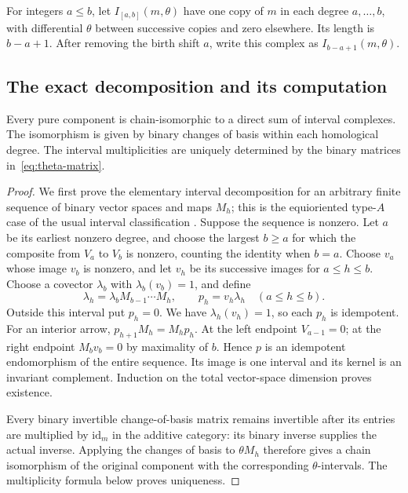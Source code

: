 \begin{definition}
For integers $a\le b$, let $I_{[a,b]}(m,\theta)$ have one copy of $m$ in
each degree $a,\ldots,b$, with differential $\theta$ between successive
copies and zero elsewhere. Its length is $b-a+1$. After removing the birth
shift $a$, write this complex as $I_{b-a+1}(m,\theta)$.
\end{definition}

\subsection{The exact decomposition and its computation}

\begin{theorem}\label{thm:interval}
Every pure component is chain-isomorphic to a direct sum of interval
complexes. The isomorphism is given by binary changes of basis within
each homological degree. The interval multiplicities are uniquely
determined by the binary matrices in~\eqref{eq:theta-matrix}.
\end{theorem}

\begin{proof}
We first prove the elementary interval decomposition for an arbitrary
finite sequence of binary vector spaces and maps $M_h$; this is the
equioriented type-$A$ case of the usual interval classification
\cite{carlsson}. Suppose the sequence is nonzero. Let $a$ be its earliest
nonzero degree, and choose the largest $b\ge a$ for which the composite
from $V_a$ to $V_b$ is nonzero, counting the identity when $b=a$.
Choose $v_a$ whose image $v_b$ is nonzero, and let $v_h$ be its successive
images for $a\le h\le b$. Choose a covector $\lambda_b$ with
$\lambda_b(v_b)=1$, and define
\[
 \lambda_h=\lambda_bM_{b-1}\cdots M_h,
 \qquad p_h=v_h\lambda_h\quad(a\le h\le b).
\]
Outside this interval put $p_h=0$. We have $\lambda_h(v_h)=1$, so each
$p_h$ is idempotent. For an interior arrow,
$p_{h+1}M_h=M_hp_h$. At the left endpoint $V_{a-1}=0$; at the right
endpoint $M_bv_b=0$ by maximality of $b$. Hence $p$ is an idempotent
endomorphism of the entire sequence. Its image is one interval and its
kernel is an invariant complement. Induction on the total vector-space
dimension proves existence.

Every binary invertible change-of-basis matrix remains invertible after
its entries are multiplied by $\mathrm{id}_m$ in the additive category:
its binary inverse supplies the actual inverse. Applying the changes
of basis to $\theta M_h$ therefore gives a chain isomorphism of the
original component with the corresponding $\theta$-intervals.
The multiplicity formula below proves uniqueness.
\end{proof}

